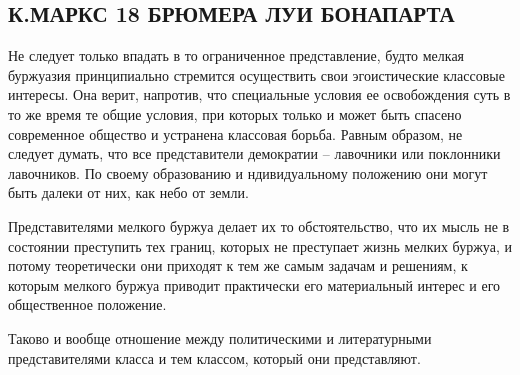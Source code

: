 \documentclass[12pt]{article}
\newcommand{\parnum}{(\arabic{parcount})}
\newcounter{parcount}
\newenvironment{parnumbers}{%
  \par%
  \everypar{\noindent \stepcounter{parcount}\marginpar[]{\parnum}}%
}{}
\begin{document}
\subsection{К.МАРКС 18 БРЮМЕРА ЛУИ БОНАПАРТА}

\begin{parnumbers}
Не следует только впадать в то ограниченное представление, будто мелкая буржуазия принципиально стремится осуществить свои эгоистические классовые интересы. Она верит, напротив, что специальные условия ее освобождения суть в то же время те общие условия, при которых только и может быть спасено современное общество и устранена классовая борьба. Равным образом, не следует думать, что все представители демократии -- лавочники или поклонники лавочников. По своему образованию и ндивидуальному положению они могут быть далеки от них, как небо от земли.

Представителями мелкого буржуа делает их то обстоятельство, что их мысль не в состоянии преступить тех границ, которых не преступает жизнь мелких буржуа, и потому теоретически они приходят к тем же самым задачам и решениям, к которым мелкого буржуа приводит практически его материальный интерес и его общественное положение.

Таково и вообще отношение между политическими и литературными представителями класса и тем классом, который они представляют.
\end{parnumbers}
\end{document}
